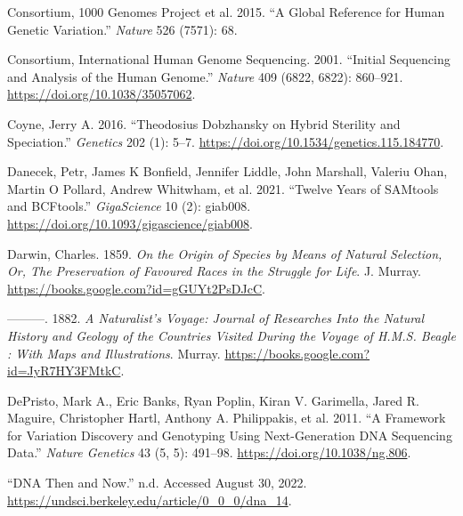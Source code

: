 \documentclass[
]{book}
\newlength{\cslhangindent}
\newlength{\cslentryspacingunit} %
\newenvironment{CSLReferences}[2] %
 {%
  \setlength{\parindent}{0pt}
  \ifodd #1
  \let\oldpar\par
  \def\par{\hangindent=\cslhangindent\oldpar}
  \fi
  \setlength{\parskip}{#2\cslentryspacingunit}
 }%
 {}
\begin{document}
\begin{CSLReferences}{1}{0}
\leavevmode{}%
Consortium, 1000 Genomes Project et al. 2015. {``A Global Reference for Human Genetic Variation.''} \emph{Nature} 526 (7571): 68.

\leavevmode{}%
Consortium, International Human Genome Sequencing. 2001. {``Initial Sequencing and Analysis of the Human Genome.''} \emph{Nature} 409 (6822, 6822): 860--921. \url{https://doi.org/10.1038/35057062}.

\leavevmode{}%
Coyne, Jerry A. 2016. {``Theodosius {Dobzhansky} on {Hybrid Sterility} and {Speciation}.''} \emph{Genetics} 202 (1): 5--7. \url{https://doi.org/10.1534/genetics.115.184770}.

\leavevmode{}%
Danecek, Petr, James K Bonfield, Jennifer Liddle, John Marshall, Valeriu Ohan, Martin O Pollard, Andrew Whitwham, et al. 2021. {``Twelve Years of {SAMtools} and {BCFtools}.''} \emph{GigaScience} 10 (2): giab008. \url{https://doi.org/10.1093/gigascience/giab008}.

\leavevmode{}%
Darwin, Charles. 1859. \emph{On the {Origin} of {Species} by {Means} of {Natural Selection}, {Or}, {The Preservation} of {Favoured Races} in the {Struggle} for {Life}}. {J. Murray}. \url{https://books.google.com?id=gGUYt2PsDJcC}.

\leavevmode{}%
---------. 1882. \emph{A {Naturalist}'s {Voyage}: {Journal} of {Researches Into} the {Natural History} and {Geology} of the {Countries Visited During} the {Voyage} of {H}.{M}.{S}. {Beagle} : With {Maps} and {Illustrations}}. {Murray}. \url{https://books.google.com?id=JyR7HY3FMtkC}.

\leavevmode{}%
DePristo, Mark A., Eric Banks, Ryan Poplin, Kiran V. Garimella, Jared R. Maguire, Christopher Hartl, Anthony A. Philippakis, et al. 2011. {``A Framework for Variation Discovery and Genotyping Using Next-Generation {DNA} Sequencing Data.''} \emph{Nature Genetics} 43 (5, 5): 491--98. \url{https://doi.org/10.1038/ng.806}.

\leavevmode{}%
{``{DNA} Then and Now.''} n.d. Accessed August 30, 2022. \url{https://undsci.berkeley.edu/article/0_0_0/dna_14}.


\end{CSLReferences}
\end{document}
